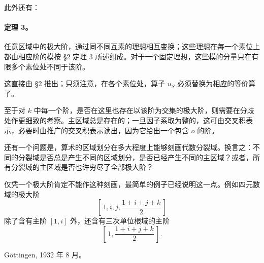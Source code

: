 此外还有：

\paragraph{定理 3。}
任意区域中的极大阶，通过同不同互素的理想相互变换；这些理想在每一个素位上都由相应阶的模按 §2 定理 3 所述组成。对于一个固定理想，这些模的分量只在有限多个素位处不同于该阶。

这直接由 §2 推出；只须注意，在各个素位处，算子 \(u_S\) 必须替换为相应的等价算子。

至于对 \(k\) 中每一个阶，是否在这里也存在以该阶为交集的极大阶，则需要在分歧处作更细致的考察。主区域总是存在的；一旦因子系取为整的，这可由交叉积表示，必要时由推广的交叉积表示读出，因为它给出一个包含 \(o\) 的阶。

还有一个问题是，算术的区域划分在多大程度上能够刻画代数分裂域。换言之：不同的分裂域是否总是产生不同的区域划分，是否已经产生不同的主区域？或者，所有分裂域的主区域是否也许穷尽了全部极大阶？

仅凭一个极大阶肯定不能作这种刻画，最简单的例子已经说明这一点。例如四元数域的极大阶
\[
        \left[\,1,i,j,\frac{1+i+j+k}{2}\,\right]
\]
除了含有主阶 \([1,i]\) 外，还含有三次单位根域的主阶
\[
        \left[\,1,\frac{1+i+j+k}{2}\,\right].
\]

\begin{center}
Göttingen, 1932 年 8 月。
\end{center}

\clearpage
\setcounter{footnote}{0}


